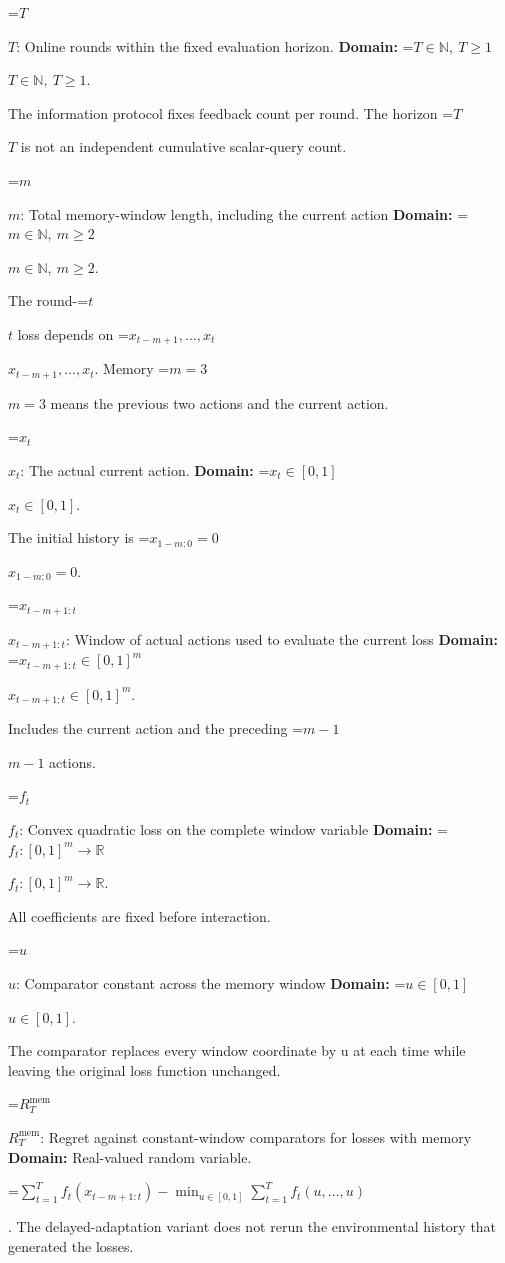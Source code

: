 \documentclass[10pt,a4paper]{article}
\newcommand{\AtlasMath}[1]{\par\begingroup\centering\setbox0=\hbox{$\displaystyle #1$}\ifdim\wd0>1.4\linewidth\typeout{ATLAS WIDE FORMULA: \the\wd0}\fi\ifdim\wd0>\linewidth\resizebox{\linewidth}{!}{\box0}\else\box0\fi\par\endgroup}
\newcommand{\AtlasInlineMath}[1]{\begingroup\setbox0=\hbox{$#1$}\ifdim\wd0>.4\linewidth\endgroup\AtlasMath{#1}\else\endgroup$#1$\fi}
\begin{document}
\AtlasInlineMath{T}: Online rounds within the fixed evaluation horizon. \textbf{Domain:} \AtlasInlineMath{T\in\mathbb N,\ T\ge1}.



The information protocol fixes feedback count per round. The horizon \AtlasInlineMath{T} is not an independent cumulative scalar-query count.



\AtlasInlineMath{m}: Total memory-window length, including the current action \textbf{Domain:} \AtlasInlineMath{m\in\mathbb N,\ m\ge2}.



The round-\AtlasInlineMath{t} loss depends on \AtlasInlineMath{x_{t-m+1},\ldots,x_t}. Memory \AtlasInlineMath{m=3} means the previous two actions and the current action.



\AtlasInlineMath{x_t}: The actual current action. \textbf{Domain:} \AtlasInlineMath{x_t\in[0,1]}.



The initial history is \AtlasInlineMath{x_{1-m:0}=0}.



\AtlasInlineMath{x_{t-m+1:t}}: Window of actual actions used to evaluate the current loss \textbf{Domain:} \AtlasInlineMath{x_{t-m+1:t}\in[0,1]^m}.



Includes the current action and the preceding \AtlasInlineMath{m-1} actions.



\AtlasInlineMath{f_t}: Convex quadratic loss on the complete window variable \textbf{Domain:} \AtlasInlineMath{f_t:[0,1]^m\to\mathbb R}.



All coefficients are fixed before interaction.



\AtlasInlineMath{u}: Comparator constant across the memory window \textbf{Domain:} \AtlasInlineMath{u\in[0,1]}.



The comparator replaces every window coordinate by u at each time while leaving the original loss function unchanged.



\AtlasInlineMath{R_T^{\mathrm{mem}}}: Regret against constant-window comparators for losses with memory \textbf{Domain:} Real-valued random variable.




\AtlasMath{\sum_{t=1}^Tf_t(x_{t-m+1:t})-\min_{u\in[0,1]}\sum_{t=1}^Tf_t(u,\ldots,u)}
. The delayed-adaptation variant does not rerun the environmental history that generated the losses.
\end{document}
